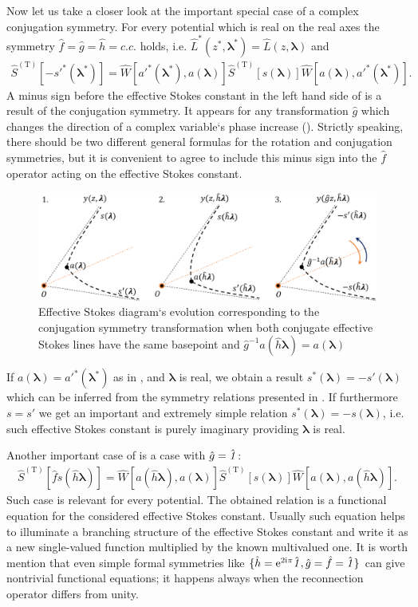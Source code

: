 \documentclass[12pt]{iopart}
\def\S{\widehat{S}}
\def\W{\widehat{W}}
\def\f{\hat{f}}
\def\g{\hat{g}}
\def\h{\hat{h}}
\def\L{\widehat{L}}
\def\lmbd{\bm{\lambda}}
\def\Tp{\mathrm{T}}
\def\unity{\hat{\it 1}}
\begin{document}
Now let us take a closer look at the important special case of a complex conjugation symmetry. 
For every potential which is real on the real axes the symmetry $\f=\g=\h=c.c.$ holds, 
i.e. $\L^*(z^*,\lmbd^*)=\L(z,\lmbd)$ and
\begin{eqnarray}
\S^{(\Tp)} \left[ -s'^*(\lmbd^*) \right] = 
\W \left[ a'^*(\lmbd^*),a(\lmbd) \right]
\S^{(\Tp)} \left[ s(\lmbd) \right]
\W \left[ a(\lmbd),a'^*(\lmbd^*) \right].
\label{eq:cnjgtn}
\end{eqnarray}
A minus sign before the effective Stokes constant in the left hand side of  is a result 
of the conjugation symmetry. It appears for any transformation $\g$ which changes the direction 
of a complex variable`s phase increase (). Strictly speaking, there should be two 
different general formulas for the rotation and conjugation symmetries, but it is convenient 
to agree to include this minus sign into the $\f$ operator acting on the effective Stokes constant.

\begin{figure}
\centering
\noindent
\includegraphics[width=\textwidth]{stuff/cs.png}
\caption{Effective Stokes diagram`s evolution corresponding to the conjugation 
symmetry transformation when both conjugate effective Stokes lines have the same 
basepoint and $\g^{-1}a(\h\lmbd)=a(\lmbd)$}
\label{fig:cst}
\end{figure} 

If $a(\lmbd)=a'^*(\lmbd^*)$ as in , and $\lmbd$ is real, we obtain a result 
$s^*(\lmbd)=-s'(\lmbd)$ which can be inferred from the symmetry relations presented in \cite{symm}. 
If furthermore $s=s'$ we get an important and extremely simple relation $s^*(\lmbd)=-s(\lmbd)$, 
i.e. such effective Stokes constant is purely imaginary providing $\lmbd$ is real.

Another important case of  is a case with $\g=\unity$:
\begin{eqnarray}
\S^{(\Tp)} \left[ \f s(\h\lmbd) \right] = 
\W \left[ a(\h\lmbd),a(\lmbd) \right]
\S^{(\Tp)} \left[ s(\lmbd) \right]
\W \left[ a(\lmbd),a(\h\lmbd) \right].
\label{eq:func}
\end{eqnarray}
Such case is relevant for every potential. The obtained relation is a functional 
equation for the considered effective Stokes constant. Usually such equation helps to illuminate 
a branching structure of the effective Stokes constant and write it as a new single-valued function 
multiplied by the known multivalued one. 
It is worth mention that even simple formal 
symmetries like $\{\h=\rme^{2\rmi\pi}\unity,\g=\f=\unity\}$
can give nontrivial functional equations; it happens always when the reconnection operator
differs from unity.
\end{document}
